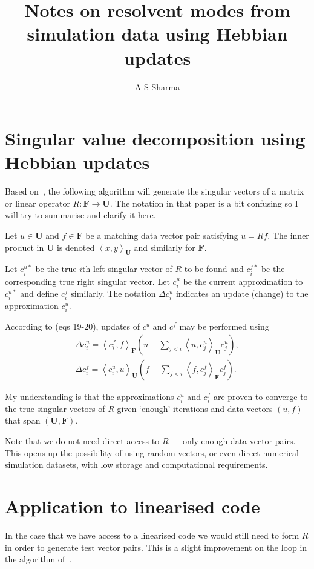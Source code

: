 \documentclass[onecolumn, twoside, 11pt]{article}
\title{Notes on resolvent modes from simulation data using Hebbian updates}
\author{A S Sharma}
\newcommand{\inprod}[2]{\left<{#1},{#2}\right>}
\newcommand\mU{\mathbf{U}}
\newcommand\mF{\mathbf{F}}
\begin{document}
\maketitle

\section{Singular value decomposition using Hebbian updates}

Based on~\cite{conf/eacl/Gorrell06}, the following algorithm will generate the singular vectors of a matrix or linear operator $R: \mF \rightarrow \mU$.
The notation in that paper is a bit confusing so I will try to summarise and clarify it here.

Let $u \in \mU$ and $f \in \mF$ be a matching data vector pair satisfying $u = Rf$. The inner product in $\mU$ is denoted $\inprod{x}{y}_\mU$ and similarly for $\mF$.

Let $c^{u*}_i$ be the true $i$th left singular vector of $R$ to be found and $c^{f*}_i$ be the corresponding true right singular vector.
Let $c^u_i$ be the current approximation to $c^{u*}_i$ and define $c^f_i$ similarly.
The notation $\Delta c^u_i$ indicates an update (change) to the approximation $c^u_i$.

According to \cite{conf/eacl/Gorrell06} (eqs 19-20), updates of $c^u$ and $c^f$ may be performed using
\begin{eqnarray}
    \label{eq:updates}
    \Delta c^u_i = \inprod{c^f_i}{f}_\mF ( u - \sum_{j<i} \inprod{u}{c^u_j}_\mU c^u_j), \\
    \Delta c^f_i = \inprod{c^u_i}{u}_\mU ( f - \sum_{j<i} \inprod{f}{c^f_j}_\mF c^f_j).
\end{eqnarray}

My understanding is that the approximations $c^u_i$ and $c^f_i$ are proven to converge to the true singular vectors of $R$ given `enough' iterations and data vectors $(u,f)$ that span $(\mU,\mF)$.

Note that we do not need direct access to $R$ --- only enough data vector pairs. This opens up the possibility of using random vectors, or even direct numerical simulation datasets, with low storage and computational requirements.

\section{Application to linearised code}

In the case that we have access to a linearised code we would still need to form $R$ in order to generate test vector pairs. This is a slight improvement on the loop in the algorithm of~\cite{doi:10.2514/6.2022-1329}.
\end{document}

